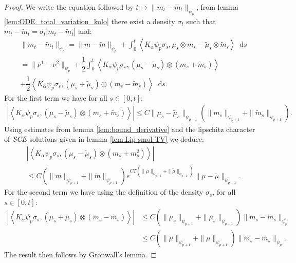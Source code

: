 \documentclass[11pt,a4paper]{article}
\newcommand{\SCE}{\emph{SCE}}
\newcommand{\brac}[1]{\left\langle#1\right\rangle}
\newcommand{\dd}{\mathop{}\!\mathrm{d}}
\begin{document}
\begin{proof}
    We write the equation followed by $t \mapsto \| m_t - \tilde{m}_t \|_{\psi_p}$, from lemma \ref{lem:ODE_total_variation_kolo} there exist a density $\sigma_t$ such that $m_t - \tilde{m}_t = \sigma_t|m_t - \tilde{m}_t|$ and:
    \begin{multline*}
        \| m_t - \tilde{m}_t \|_{\psi_p} = \|m-\tilde{m} \|_{\psi_{p}} + \int_0^t \brac{K_\alpha\psi_p\sigma_s, \mu_s\otimes m_s - \tilde{\mu}_s\otimes \tilde{m}_s} \dd s \\
        = \|\nu^1- \nu^2 \|_{\psi_{p}} + \dfrac12\int_0^t \brac{K_\alpha\psi_p\sigma_s, (\mu_s - \tilde{\mu}_s)\otimes (m_s + \tilde{m}_s) } \\
        + \dfrac12\brac{K_\alpha\psi_p\sigma_s, (\mu_s + \tilde{\mu}_s)\otimes (m_s - \tilde{m}_s)} \dd s.
    \end{multline*}
    For the first term we have for all $s \in [0,t]$:
    \begin{align*}
        \left| \brac{K_\alpha\psi_p\sigma_s, (\mu_s - \tilde{\mu}_s)\otimes (m_s + \tilde{m}_s)}\right| \leq C\| \mu_s - \tilde{\mu}_s\|_{\psi_{p+1}} \left(\| m_s\|_{\psi_{p+1}} + \| \tilde{m}_s\|_{\psi_{p+1}}\right).
    \end{align*}
    Using estimates from lemma \ref{lem:bound_derivative} and the lipschitz character of $\SCE$ solutions given in lemma \ref{lem:Lip-smol-TV} we deduce:
    \begin{multline*}
        \left| \brac{K_\alpha\psi_p\sigma_s, (\mu_s - \tilde{\mu}_s)\otimes (m_s + m_s^2) }\right| \\
        \leq C(\|m\|_{\psi_{p+1}}+ \|\tilde{m}\|_{\psi_{p+1}})e^{CT\left(\|\mu\|_{\psi_{p +2}} + \|\tilde{\mu}\|_{\psi_{p +2}}\right)} \|\mu - \tilde{\mu}\|_{\psi_{p+1}}.
    \end{multline*}
    For the second term we have using the definition of the density $\sigma_s$, for all $s \in [0,t]$:
    \begin{align*}
        \left| \brac{K_\alpha\psi_p\sigma_s, (\mu_s + \tilde{\mu}_s)\otimes (m_s - \tilde{m}_s)} \right| 
        &\leq C \left(\| \tilde{\mu}_s\|_{\psi_{p+1}} + \| \mu_s\|_{\psi_{p+1}}\right)\|m_s - \tilde{m}_s \|_{\psi_p} \\
        &\leq C \left(\| \tilde{\mu}\|_{\psi_{p+1}} + \| \mu\|_{\psi_{p+1}}\right)\|m_s - \tilde{m}_s \|_{\psi_p}.
    \end{align*}
    The result then follows by Gronwall's lemma.
\end{proof}
\end{document}
